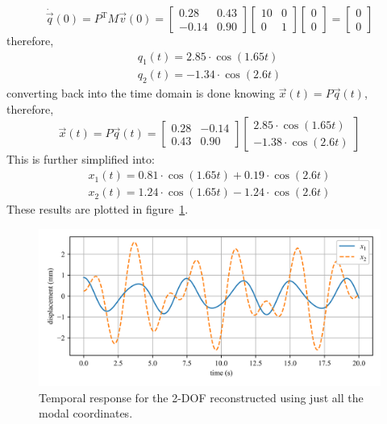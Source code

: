 \documentclass[12pt,letter]{article}
\begin{document}
\begin{example}
\begin{equation}
	\end{equation}
	\begin{equation}
	\dot{\vec{q}}(0) = P^\text{T} M \vec{v}(0) = \begin{bmatrix} 0.28 &  0.43 \\  -0.14    & 0.90 \end{bmatrix} \begin{bmatrix} 10 & 0 \\  0  & 1 \end{bmatrix}  \begin{bmatrix} 0 \\  0 \end{bmatrix} =  \begin{bmatrix}  0 \\  0 \end{bmatrix}
	\end{equation}
	therefore, 
	\begin{eqnarray}
	q_1(t) = 2.85 \cdot \cos (1.65 t) \\ 
	q_2(t) = -1.34 \cdot \cos (2.6 t)  \nonumber
	\label{eq:participation}
	\end{eqnarray}
	converting back into the time domain is done knowing $\vec{x}(t) = P\vec{q}(t)$, therefore, 
	\begin{equation}
	\vec{x}(t) = P\vec{q}(t) = \begin{bmatrix} 0.28 & -0.14 \\    0.43  & 0.90 \end{bmatrix}  \begin{bmatrix} 2.85 \cdot \cos (1.65 t) \\  -1.38 \cdot \cos (2.6 t) \end{bmatrix}
	\end{equation}
	This is further simplified into:
	\begin{eqnarray}
	x_1(t) = 0.81 \cdot \cos (1.65 t) + 0.19 \cdot \cos (2.6 t) \\ 
	x_2(t) = 1.24 \cdot \cos (1.65 t) - 1.24 \cdot \cos (2.6 t)  \nonumber
	\end{eqnarray}
	These results are plotted in figure~\ref{fig:modal_analysis_free_vibration}.
	\begin{figure}[H]
		\centering
		\includegraphics[width=\linewidth]{../figures/modal_analysis_free_vibration.png}
		\caption{Temporal response for the 2-DOF reconstructed using just all the modal coordinates.}
		\label{fig:modal_analysis_free_vibration}
	\end{figure}
	

\end{example}
\end{document}
